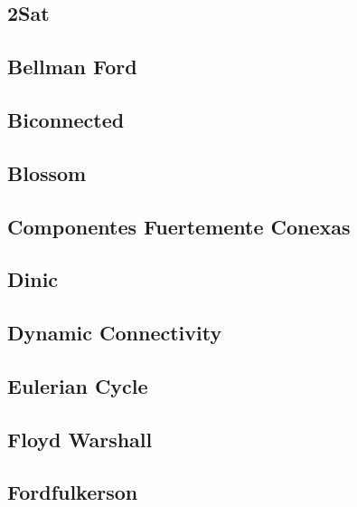 \documentclass[9pt,portrait,twocolumn,a4paper,notitlepage]{article}
\newcommand\cppfile[2][]{%
\ifstrempty{#1}{}{}%
}
\begin{document}
\subsection{2Sat}
\cppfile{grafos_clean/2SAT.cpp}

\subsection{Bellman Ford}
\cppfile{grafos_clean/bellman_ford.cpp}

\subsection{Biconnected}
\cppfile{grafos_clean/biconnected.cpp}

\subsection{Blossom}
\cppfile{grafos_clean/blossom.cpp}

\subsection{Componentes Fuertemente Conexas}
\cppfile{grafos_clean/componentes_fuertemente_conexas.cpp}

\subsection{Dinic}
\cppfile{grafos_clean/dinic.cpp}

\subsection{Dynamic Connectivity}
\cppfile{grafos_clean/dynamic_Connectivity.cpp}

\subsection{Eulerian Cycle}
\cppfile{grafos_clean/eulerian_cycle.cpp}

\subsection{Floyd Warshall}
\cppfile{grafos_clean/floyd_warshall.cpp}

\subsection{Fordfulkerson}
\cppfile{grafos_clean/FordFulkerson.cpp}
\end{document}
